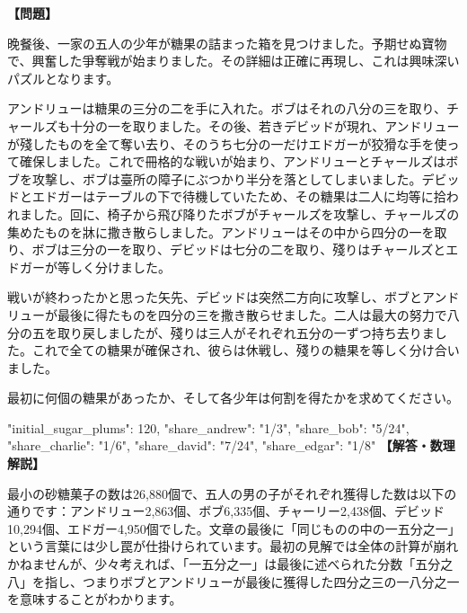 \documentclass[10pt,a4paper,oneside,openany]{ltjsbook}
\begin{document}
\begin{tcolorbox}[colback=softblue,colframe=primaryblue,title=\textbf{第 109 問：THE GREAT SCRAMBLE.},arc=2mm,boxrule=1pt,breakable]
\textbf{【問題】}\par\vspace{0.3em}
晚餐後、一家の五人の少年が糖果の詰まった箱を見つけました。予期せぬ寶物で、興奮した爭奪戦が始まりました。その詳細は正確に再現し、これは興味深いパズルとなります。

アンドリューは糖果の三分の二を手に入れた。ボブはそれの八分の三を取り、チャールズも十分の一を取りました。その後、若きデビッドが現れ、アンドリューが殘したものを全て奪い去り、そのうち七分の一だけエドガーが狡猾な手を使って確保しました。これで冊格的な戦いが始まり、アンドリューとチャールズはボブを攻撃し、ボブは臺所の障子にぶつかり半分を落としてしまいました。デビッドとエドガーはテーブルの下で待機していたため、その糖果は二人に均等に拾われました。回に、椅子から飛び降りたボブがチャールズを攻撃し、チャールズの集めたものを牀に撒き散らしました。アンドリューはその中から四分の一を取り、ボブは三分の一を取り、デビッドは七分の二を取り、殘りはチャールズとエドガーが等しく分けました。

戦いが終わったかと思った矢先、デビッドは突然二方向に攻撃し、ボブとアンドリューが最後に得たものを四分の三を撒き散らせました。二人は最大の努力で八分の五を取り戻しましたが、殘りは三人がそれぞれ五分の一ずつ持ち去りました。これで全ての糖果が確保され、彼らは休戦し、殘りの糖果を等しく分け合いました。

最初に何個の糖果があったか、そして各少年は何割を得たかを求めてください。

{
  "initial\_sugar\_plums": 120,
  "share\_andrew": "1/3",
  "share\_bob": "5/24",
  "share\_charlie": "1/6",
  "share\_david": "7/24",
  "share\_edgar": "1/8"
}
\tcblower
\textbf{【解答・数理解説】}\par\vspace{0.3em}
最小の砂糖菓子の数は26,880個で、五人の男の子がそれぞれ獲得した数は以下の通りです：アンドリュー2,863個、ボブ6,335個、チャーリー2,438個、デビッド10,294個、エドガー4,950個でした。文章の最後に「同じものの中の一五分之一」という言葉には少し罠が仕掛けられています。最初の見解では全体の計算が崩れかねませんが、少々考えれば、「一五分之一」は最後に述べられた分数「五分之八」を指し、つまりボブとアンドリューが最後に獲得した四分之三の一八分之一を意味することがわかります。
\end{tcolorbox}
\end{document}

